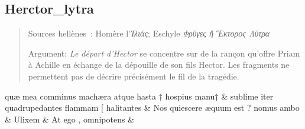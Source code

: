 \documentclass[12pt,onecolumn,twoside,a4paper]{memoir}
\begin{document}
               \subsection*{Herctor_lytra}
               \begin{abstract}
                   Sources hellènes : Homère l'\textit{Ἰλιάς}; Eschyle
                        \textit{Φρύγες ἢ Ἕκτορος Λύτρα}
                  \par
                   Argument: \textit{Le départ d'Hector} se concentre sur de la rançon
                     qu’offre Priam à Achille en échange de la dépouille de son fils Hector. Les
                     fragments ne permettent pas de décrire précisément le fil de la tragédie. \par
               \end{abstract}
               \begin{pairs}
                  \begin{Leftside}
			\beginnumbering
			\setcounter{stanzaL}{0}
                     
                         \stanza 
                     quæ
                              mea
                              comminus
                              machæra
                              atque
                              hasta
                              †
                              hospius
                              manu† \&
                         \stanza 
                     sublime
                              iter
                              quadrupedantes
                              flammam
                              [
                              halitantes \&
                         \stanza Nos
                              quiescere
                              æquum
                              est
                              ?
                              nomus
                              ambo &
                     Ulixem \&
                         \stanza At
                              ego
                              ,
                              omnipotens &
                     

\end{Leftside}
\end{pairs}
\end{document}
